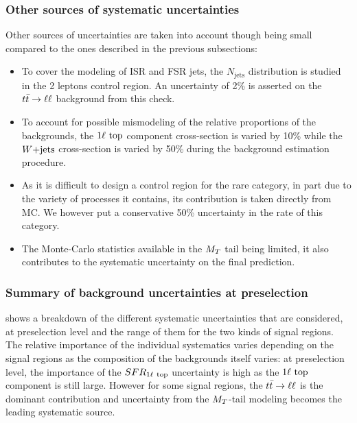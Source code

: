             \subsubsection{Other sources of systematic uncertainties}

            Other sources of uncertainties are taken into account though being small compared
            to the ones described in the previous subsections:
            \begin{itemize}
                \item To cover the modeling of ISR and FSR jets, the $N_\text{jets}$
                      distribution is studied in the 2 leptons control region. An
                      uncertainty of 2\% is asserted on the $t\bar{t} \rightarrow \ell \ell$ background
                      from this check.
                \item To account for possible mismodeling of the relative proportions of
                      the backgrounds, the $1\ell~\text{top}$ component cross-section
                      is varied by 10\% while the $\text{$W$+jets}$ cross-section is varied by 50\%
                      during the background estimation procedure.
                \item As it is difficult to design a control region for the rare category,
                      in part due to the variety of processes it contains, its contribution
                      is taken directly from MC. We however put a conservative 50\% uncertainty
                      in the rate of this category.
                \item The Monte-Carlo statistics available in the $M_T$ tail being limited,
                      it also contributes to the systematic uncertainty on the final prediction.
            \end{itemize}

            \subsubsection{Summary of background uncertainties at preselection}

             shows a breakdown of the different systematic
            uncertainties that are considered, at preselection level and the range of them
            for the two kinds of signal regions. The relative importance of the individual
            systematics varies depending on the signal regions as the composition of the
            backgrounds itself varies: at preselection level, the importance of the
            $SFR_{1\ell~\text{top}}$ uncertainty is high as the $1\ell~\text{top}$ component is still large.
            However for some signal regions, the $t\bar{t} \rightarrow \ell \ell$ is the dominant contribution and
            uncertainty from the $M_T$-tail modeling becomes the leading systematic source.

